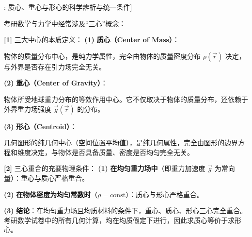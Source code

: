 \documentclass[11pt,a4paper,UTF8]{ctexart}
\begin{document}
\begin{thmbox}[理论[1]: 质心、重心与形心的科学辨析与统一条件]

考研数学与力学中经常涉及“三心”概念：

\textbf{[1]} 三大中心的本质定义：
\textbf{(1)}  \textbf{质心（Center of Mass）}：

物体的质量分布中心，是纯力学属性，完全由物体的质量密度分布 $\rho(\vec{r})$ 决定，与外界是否存在引力场完全无关。

\textbf{(2)}  \textbf{重心（Center of Gravity）}：

物体所受地球重力分布的等效作用中心。它不仅取决于物体的质量分布，还依赖于外界重力场强度 $\vec{g}(\vec{r})$ 的分布。

\textbf{(3)}  \textbf{形心（Centroid）}：

几何图形的纯几何中心（空间位置平均值），是纯几何属性，完全由图形的边界方程和维度决定，与物体是否具备质量、密度是否均匀完全无关。

\textbf{[2]} 三心重合的充要物理条件：
\textbf{(1)}  \textbf{在均匀重力场中}（即重力加速度 $\vec{g}$ 为常向量）：重心与质心严格重合。

\textbf{(2)}  \textbf{在物体密度为均匀常数时}（$\rho = \text{const}$）：质心与形心严格重合。

\textbf{(3)}  \textbf{结论}：在均匀重力场且均质材料的条件下，重心、质心、形心三心完全重合。考研数学试卷中的所有几何计算，均在均质假定下进行，因此求质心等价于求形心。

\end{thmbox}
\end{document}
